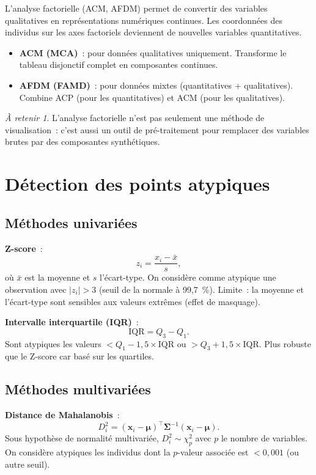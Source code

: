\documentclass[a4paper,11pt]{article}
\theoremstyle{definition}
\theoremstyle{remark}
\newtheorem*{important}{À retenir}
\begin{document}
L'analyse factorielle (ACM, AFDM) permet de convertir des variables
qualitatives en représentations numériques continues. Les coordonnées
des individus sur les axes factoriels deviennent de nouvelles variables
quantitatives.

\begin{itemize}
  \item \textbf{ACM (MCA)}~: pour données qualitatives uniquement.
    Transforme le tableau disjonctif complet en composantes continues.
  \item \textbf{AFDM (FAMD)}~: pour données mixtes (quantitatives +
    qualitatives). Combine ACP (pour les quantitatives) et ACM (pour
    les qualitatives).
\end{itemize}

\begin{important}
  L'analyse factorielle n'est pas seulement une méthode de visualisation~:
  c'est aussi un outil de pré-traitement pour remplacer des variables
  brutes par des composantes synthétiques.
\end{important}

\section{Détection des points atypiques}

\subsection{Méthodes univariées}

\textbf{Z-score}~:
\[
z_i = \frac{x_i - \bar{x}}{s},
\]
où $\bar{x}$ est la moyenne et $s$ l'écart-type. On considère comme
atypique une observation avec $|z_i| > 3$ (seuil de la normale à 99,7~\%).
Limite~: la moyenne et l'écart-type sont sensibles aux valeurs extrêmes
(effet de masquage).

\textbf{Intervalle interquartile (IQR)}~:
\[
\text{IQR} = Q_3 - Q_1.
\]
Sont atypiques les valeurs $< Q_1 - 1{,}5 \times \text{IQR}$ ou
$> Q_3 + 1{,}5 \times \text{IQR}$. Plus robuste que le Z-score car
basé sur les quartiles.

\subsection{Méthodes multivariées}

\textbf{Distance de Mahalanobis}~:
\[
D_i^2 = (\mathbf{x}_i - \boldsymbol{\mu})^\top \boldsymbol{\Sigma}^{-1}
        (\mathbf{x}_i - \boldsymbol{\mu}).
\]
Sous hypothèse de normalité multivariée, $D_i^2 \sim \chi^2_p$ avec $p$
le nombre de variables.
On considère atypiques les individus dont la $p$-valeur associée est
$< 0{,}001$ (ou autre seuil).
\end{document}
